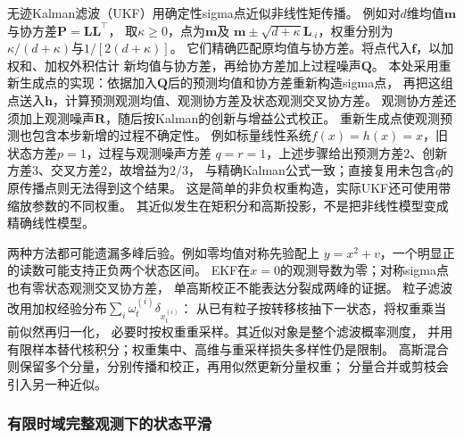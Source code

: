 无迹Kalman滤波（UKF）用确定性sigma点近似非线性矩传播。
例如对$d$维均值$\bm m$与协方差$\bm P=\bm L\bm L^\top$，
取$\kappa\geq0$，点为$\bm m$及
$\bm m\pm\sqrt{d+\kappa}\bm L_{\cdot i}$，权重分别为
$\kappa/(d+\kappa)$与$1/[2(d+\kappa)]$。
它们精确匹配原均值与协方差。将点代入$\bm f$，以加权和、加权外积估计
新均值与协方差，再给协方差加上过程噪声$\bm Q$。
本处采用重新生成点的实现：依据加入$\bm Q$后的预测均值和协方差重新构造sigma点，
再把这组点送入$\bm h$，计算预测观测均值、观测协方差及状态观测交叉协方差。
观测协方差还须加上观测噪声$\bm R$，随后按Kalman的创新与增益公式校正。
重新生成点使观测预测也包含本步新增的过程不确定性。
例如标量线性系统$f(x)=h(x)=x$，旧状态方差$p=1$，过程与观测噪声方差
$q=r=1$，上述步骤给出预测方差$2$、创新方差$3$、交叉方差$2$，故增益为$2/3$，
与精确Kalman公式一致；直接复用未包含$q$的原传播点则无法得到这个结果。
这是简单的非负权重构造，实际UKF还可使用带缩放参数的不同权重。
其近似发生在矩积分和高斯投影，不是把非线性模型变成精确线性模型。

两种方法都可能遗漏多峰后验。例如零均值对称先验配上
$y=x^2+v$，一个明显正的读数可能支持正负两个状态区间。
EKF在$x=0$的观测导数为零；对称sigma点也有零状态观测交叉协方差，
单高斯校正不能表达分裂成两峰的证据。
粒子滤波改用加权经验分布$\sum_i\omega_t^{(i)}\delta_{x_t^{(i)}}$：
从已有粒子按转移核抽下一状态，将权重乘当前似然再归一化，
必要时按权重重采样。其近似对象是整个滤波概率测度，
并用有限样本替代核积分；权重集中、高维与重采样损失多样性仍是限制。
高斯混合则保留多个分量，分别传播和校正，再用似然更新分量权重；
分量合并或剪枝会引入另一种近似。

\subsubsection{有限时域完整观测下的状态平滑}


